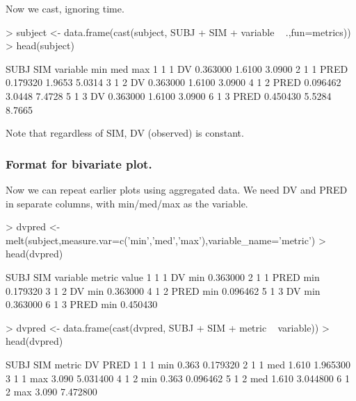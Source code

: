 Now we cast, ignoring time.
\begin{Schunk}
\begin{Sinput}
> subject <- data.frame(cast(subject, SUBJ + SIM + variable ~ .,fun=metrics))
> head(subject)
\end{Sinput}
\begin{Soutput}
  SUBJ SIM variable      min    med    max
1    1   1       DV 0.363000 1.6100 3.0900
2    1   1     PRED 0.179320 1.9653 5.0314
3    1   2       DV 0.363000 1.6100 3.0900
4    1   2     PRED 0.096462 3.0448 7.4728
5    1   3       DV 0.363000 1.6100 3.0900
6    1   3     PRED 0.450430 5.5284 8.7665
\end{Soutput}
\end{Schunk}
Note that regardless of SIM, DV (observed) is constant.
\subsubsection{Format for bivariate plot.}
Now we can repeat earlier plots using aggregated data.  We need DV and PRED
in separate columns, with min/med/max as the variable.
\begin{Schunk}
\begin{Sinput}
> dvpred <- melt(subject,measure.var=c('min','med','max'),variable_name='metric')
> head(dvpred)
\end{Sinput}
\begin{Soutput}
  SUBJ SIM variable metric    value
1    1   1       DV    min 0.363000
2    1   1     PRED    min 0.179320
3    1   2       DV    min 0.363000
4    1   2     PRED    min 0.096462
5    1   3       DV    min 0.363000
6    1   3     PRED    min 0.450430
\end{Soutput}
\begin{Sinput}
> dvpred <- data.frame(cast(dvpred, SUBJ + SIM + metric ~ variable))
> head(dvpred)
\end{Sinput}
\begin{Soutput}
  SUBJ SIM metric    DV     PRED
1    1   1    min 0.363 0.179320
2    1   1    med 1.610 1.965300
3    1   1    max 3.090 5.031400
4    1   2    min 0.363 0.096462
5    1   2    med 1.610 3.044800
6    1   2    max 3.090 7.472800
\end{Soutput}
\end{Schunk}
